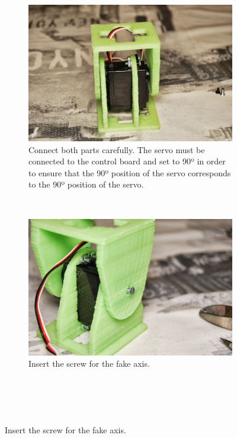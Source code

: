 \begin{figure}[H]
        \centering
        \begin{subfigure}[b]{0.46\textwidth}
                \centering
                \includegraphics[width=\textwidth]{images/REPY2_assembly_14.jpg}
                \caption{Connect both parts carefully. The servo must be connected to the control board and set to 90º in order to ensure that the 90º position of the servo corresponds to the 90º position of the servo.\\}
                \label{fig:hardware_assembly_14}
        \end{subfigure}
        ~
        \begin{subfigure}[b]{0.46\textwidth}
                \centering
                \includegraphics[width=\textwidth]{images/REPY2_assembly_15.jpg}
                \caption{Insert the screw for the fake axis.\\~\\~\\~\\~}

\end{subfigure}
\end{figure}
